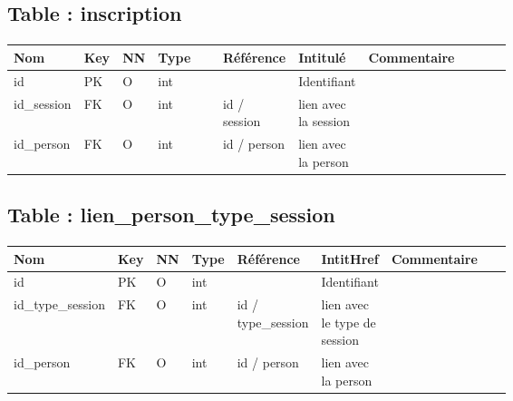 	\subsection{Table : inscription}
		\paragraph{}
			\begin{tabularx}{\linewidth}{|T{0.14\linewidth}|T{0.05\linewidth}|T{0.05\linewidth}|T{0.13\linewidth}|T{0.14\linewidth}|T{0.13\linewidth}|Y|}
				\hline
				Nom & Key & NN & Type & Référence & Intitulé & Commentaire \\
				\hline
				id & PK & O & int & & Identifiant & \\
				\hline
				id\_session & FK & O & int & id / session & lien avec la session & \\
				\hline
				id\_person & FK & O & int & id / person & lien avec la person & \\
				\hline
			\end{tabularx}
			
			
	\vspace{\baselineskip}
	\subsection{Table : lien\_person\_type\_session}
		\paragraph{}
			\begin{tabularx}{\linewidth}{|T{0.2\linewidth}|T{0.05\linewidth}|T{0.05\linewidth}|T{0.06\linewidth}|T{0.15\linewidth}|T{0.13\linewidth}|Y|}
				\hline
				Nom & Key & NN & Type & Référence & IntitHref& Commentaire \\
				\hline
				id & PK & O & int & & Identifiant & \\
				\hline
				id\_type\_session & FK & O & int & id / type\_session & lien avec le type de session & \\
				\hline
				id\_person & FK & O & int & id / person & lien avec la person & \\
				\hline
			\end{tabularx}